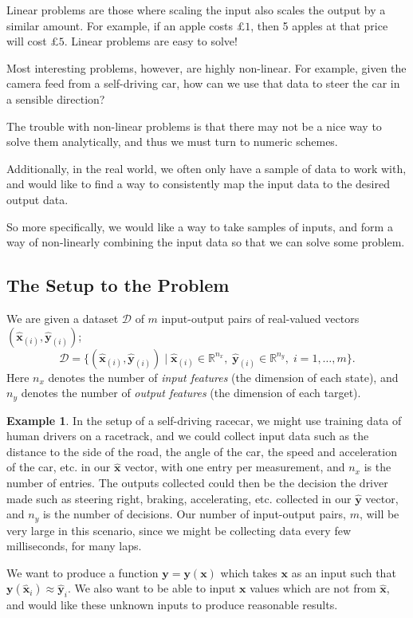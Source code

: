 \documentclass[a4paper]{article}
\theoremstyle{plain} %
\theoremstyle{definition} %
\newtheorem*{example}{Example}
\numberwithin{equation}{subsection}
\newcommand{\R}{\mathbb{R}}
\newcommand{\vx}{{\textbf{x}}}
\newcommand{\vy}{{\textbf{y}}}
\newcommand{\vxh}{{\widehat{\textbf{x}}}}
\newcommand{\vyh}{{\widehat{\textbf{y}}}}
\begin{document}
Linear problems are those where scaling the input also scales the output by a similar amount. 
For example, if an apple costs £$1$, then 5 apples at that price will cost £$5$. 
Linear problems are easy to solve! 

Most interesting problems, however, are highly non-linear. 
For example, given the camera feed from a self-driving car, how can we use that data to steer the car in a sensible direction?

The trouble with non-linear problems is that there may not be a nice way to solve them analytically, and thus we must turn to numeric schemes.

Additionally, in the real world, we often only have a sample of data to work with, and would like to find a way to consistently map the input data to the desired output data.

So more specifically, we would like a way to take samples of inputs, and form a way of non-linearly combining the input data so that we can solve some problem.

\subsection{The Setup to the Problem} \label{sec:the-setup-to-the-problem}

We are given a dataset $\mathcal{D}$ of $m$ input-output pairs of real-valued vectors $(\vxh_{(i)}, \vyh_{(i)})$; 
\[
\mathcal{D} = \{(\vxh_{(i)}, \vyh_{(i)}) \mid \vxh_{(i)} \in \R^{n_x}, \; \vyh_{(i)} \in \R^{n_y}, \; i=1,\dots,m \}.
\]
Here $n_x$ denotes the number of \emph{input features} (the dimension of each state), and 
$n_y$ denotes the number of \emph{output features} (the dimension of each target).
\begin{example}
  
  In the setup of a self-driving racecar, we might use training data of human drivers on a racetrack, 
  and we could collect input data such as the distance to the side of the road, 
  the angle of the car, the speed and acceleration of the car, etc. in our $\vxh$ vector, with one entry per measurement, 
  and $n_x$ is the number of entries.
  The outputs collected could then be the decision the driver made such as steering right, braking, accelerating, etc. collected in our $\vyh$ vector, 
  and $n_y$ is the number of decisions. 
  Our number of input-output pairs, $m$, will be very large in this scenario, since we might be collecting data every few milliseconds, for many laps.
\end{example}
We want to produce a function $\vy = \vy(\vx)$ which takes $\vx$ as an input such that $\vy(\vxh_{i}) \approx \vyh_{i}$. 
We also want to be able to input $\vx$ values which are not from $\vxh$, and would like these unknown inputs to produce reasonable results.
\end{document}
